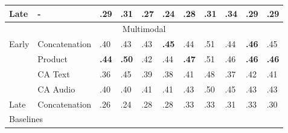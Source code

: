 \documentclass{article}
\begin{document}
\begin{table}[H]
\begin{tabular}{|lllllllllll|}
\multicolumn{1}{|l|}{Late}                   & \multicolumn{1}{l|}{-}             & .29                & .31                & .27                & .24                & .28                & .31                & .34                & \multicolumn{1}{l|}{.29}                & .29                   \\ \hline
\multicolumn{11}{|c|}{Multimodal}                                                                                                                                                                                                                                                                      \\ \hline
\multicolumn{1}{|l|}{\multirow{4}{*}{Early}} & \multicolumn{1}{l|}{Concatenation} & .40                & .43                & .43                & \textbf{.45}       & .44                & .51                & .44                & \multicolumn{1}{l|}{\textbf{.46}}       & .45                   \\
\multicolumn{1}{|l|}{}                       & \multicolumn{1}{l|}{Product}       & \textbf{.44}       & \textbf{.50}       & .42                & .44                & \textbf{.47}       & .51                & .46                & \multicolumn{1}{l|}{\textbf{.46}}       & \textbf{.46}          \\
\multicolumn{1}{|l|}{}                       & \multicolumn{1}{l|}{CA Text}       & .36                & .45                & .39                & .38                & .41                & .48                & .37                & \multicolumn{1}{l|}{.42}                & .41                   \\
\multicolumn{1}{|l|}{}                       & \multicolumn{1}{l|}{CA Audio}      & .40                & .40                & .41                & .41                & .43                & .50                & .45                & \multicolumn{1}{l|}{.43}                & .43                   \\
\multicolumn{1}{|l|}{Late}                   & \multicolumn{1}{l|}{Concatenation} & .26                & .24                & .28                & .28                & .33                & .33                & .31                & \multicolumn{1}{l|}{.33}                & .30                   \\ \hline
\multicolumn{11}{|l|}{Baselines}                                                                                                                                                                                                                                                                       \\ \hline

\end{tabular}
\end{table}
\end{document}
